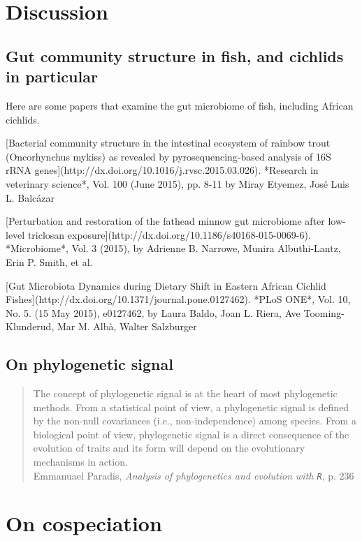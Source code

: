 \section{Discussion}

\subsection{Gut community structure in fish, and cichlids in particular}

Here are some papers that examine the gut microbiome of fish, including
African cichlids.

[Bacterial community structure in the intestinal ecosystem of rainbow trout (Oncorhynchus mykiss) as revealed by pyrosequencing-based analysis of 16S rRNA genes](http://dx.doi.org/10.1016/j.rvsc.2015.03.026). *Research in veterinary science*, Vol. 100 (June 2015), pp. 8-11 by Miray Etyemez, José Luis L. Balcázar

[Perturbation and restoration of the fathead minnow gut microbiome after low-level triclosan exposure](http://dx.doi.org/10.1186/s40168-015-0069-6). *Microbiome*, Vol. 3 (2015), by Adrienne B. Narrowe, Munira Albuthi-Lantz, Erin P. Smith, et al.

[Gut Microbiota Dynamics during Dietary Shift in Eastern African Cichlid Fishes](http://dx.doi.org/10.1371/journal.pone.0127462). *PLoS ONE*, Vol. 10, No. 5. (15 May 2015), e0127462, by Laura Baldo, Joan L. Riera, Ave Tooming-Klunderud, Mar M. Albà, Walter Salzburger


\subsection{On phylogenetic signal}

\begin{quote}
The concept of phylogenetic signal is at the heart of most phylogenetic methods. From a statistical point of view, a phylogenetic signal is  defined by the non-null covariances (i.e., non-independence) among species. From a biological point of view, phylogenetic signal is a direct consequence of the evolution of traits and its form will depend on the evolutionary mechanisms in action.\\
Emmanuael Paradis, {\em Analysis of phylogenetics and evolution with {\tt R}}, p. 236
\end{quote}

\section{On cospeciation}

